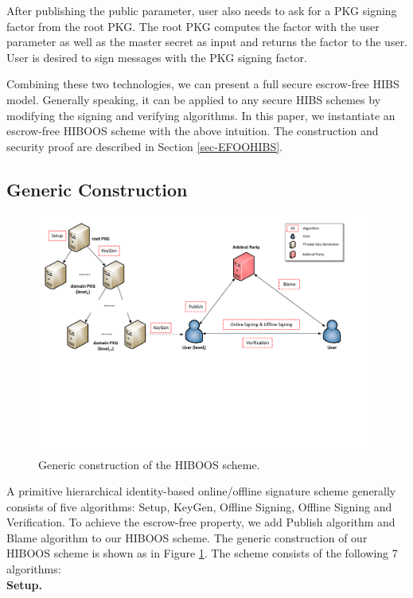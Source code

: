 \documentclass[times]{secauth}
\theoremstyle{definition}
\theoremstyle{remark}
\begin{document}
After publishing the public parameter, user also needs to ask for a PKG signing factor from the root PKG. 
The root PKG computes the factor with the user parameter as well as the master secret as input and returns the factor to the user.
User is desired to sign messages with the PKG signing factor. 
\par 
Combining these two technologies, we can present a full secure escrow-free HIBS model. 
Generally speaking, it can be applied to any secure HIBS schemes by modifying the signing and verifying algorithms.
In this paper, we instantiate an escrow-free HIBOOS scheme with the above intuition. 
The construction and security proof are described in Section \ref{sec-EFOOHIBS}.

\subsection{Generic Construction}
\begin{figure}
\centering
\includegraphics[width=15cm]{schema.pdf}
\caption{Generic construction of the HIBOOS scheme.} \label{fig-schema}
\end{figure}
A primitive hierarchical identity-based online/offline signature scheme generally consists of five algorithms: Setup, KeyGen, Offline Signing, Offline Signing and Verification.
To achieve the escrow-free property, we add Publish algorithm and Blame algorithm to our HIBOOS scheme.
The generic construction of our HIBOOS scheme is shown as in Figure \ref{fig-schema}. 
The scheme consists of the following 7 algorithms:
\vspace{0.1cm}
\\
\textbf{Setup.}
\end{document}
